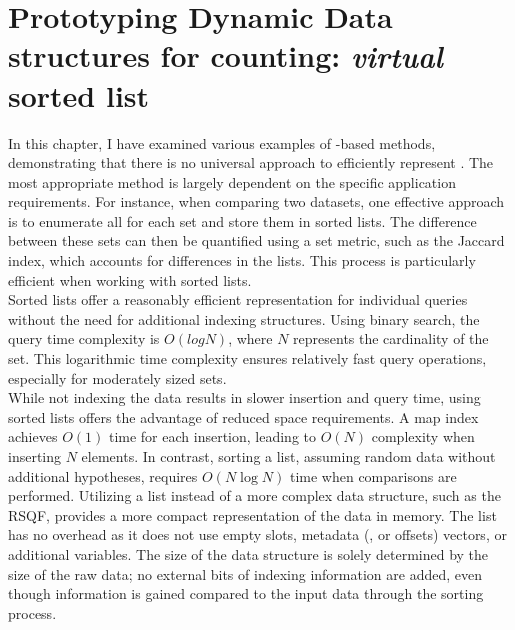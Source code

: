 \clearpage

\section{Prototyping Dynamic Data structures for \kmer counting: \emph{virtual} \skmer sorted list}
\label{sec:skmers}
In this chapter, I have examined various examples of \kmer-based methods, demonstrating that there is no universal approach to efficiently represent \kmers. The most appropriate method is largely dependent on the specific application requirements. For instance, when comparing two datasets, one effective approach is to enumerate all \kmers for each set and store them in sorted lists. The difference between these sets can then be quantified using a set metric, such as the Jaccard index, which accounts for \kmer differences in the lists. This process is particularly efficient when working with sorted lists.\\
Sorted \kmer lists offer a reasonably efficient representation for individual \kmer queries without the need for additional indexing structures. Using binary search, the query time complexity is $O(log{N})$, where $N$ represents the cardinality of the set. This logarithmic time complexity ensures relatively fast query operations, especially for moderately sized sets.\\
While not indexing the data results in slower insertion and query time, using sorted lists offers the advantage of reduced space requirements. A map index achieves $O(1)$ time for each insertion, leading to $O(N)$ complexity when inserting $N$ elements. In contrast, sorting a list, assuming random data without additional hypotheses, requires $O(N\log{N})$ time when comparisons are performed. Utilizing a list instead of a more complex data structure, such as the RSQF, provides a more compact representation of the data in memory. The list has no overhead as it does not use empty slots, metadata (\occs, \rends or offsets) vectors, or additional variables. The size of the data structure is solely determined by the size of the raw data; no external bits of indexing information are added, even though information is gained compared to the input data through the sorting process.

